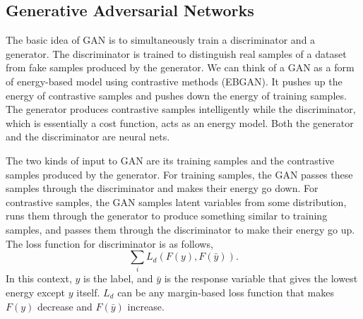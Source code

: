 \documentclass{article}
\begin{document}



\subsection{Generative Adversarial Networks}


The basic idea of GAN is to simultaneously train a discriminator and a generator. The discriminator is trained to distinguish real samples of a dataset from fake samples produced by the generator. We can think of a GAN as a form of energy-based model using contrastive methods (EBGAN). It pushes up the energy of contrastive samples and pushes down the energy of training samples. The generator produces contrastive samples intelligently while the discriminator, which is essentially a cost function, acts as an energy model. Both the generator and the discriminator are neural nets. 

The two kinds of input to GAN are its training samples and the contrastive samples produced by the generator. For training samples, the GAN passes these samples through the discriminator and makes their energy go down. For contrastive samples, the GAN samples latent variables from some distribution, runs them through the generator to produce something similar to training samples, and passes them through the discriminator to make their energy go up. The loss function for discriminator is as follows,
\[
    \sum_i  L_d(F(y), F(\bar y)).
\]
In this context, $y$ is the label, and $\bar{y}$ is the response variable that gives the lowest energy except $y$ itself. $L_d$ can be any margin-based loss function that makes $F(y)$ decrease and $F(\bar{y})$ increase.
\end{document}
